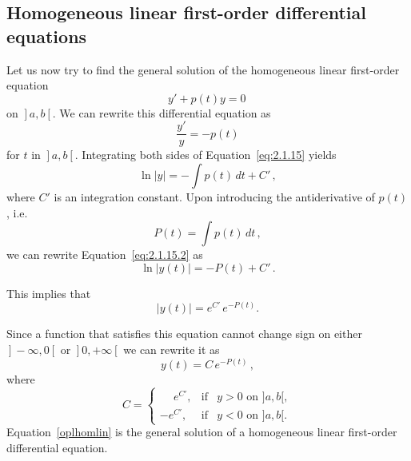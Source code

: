 \subsection{Homogeneous linear first-order differential equations}
\label{homolinsec}

Let us now try to find the general solution of the homogeneous linear first-order equation
$$
y'+p(t)y=0\,
$$
on $\left.\right]a,b\left[\right.$. 
We can rewrite this differential equation as 
\begin{equation}\label{eq:2.1.15}
\dfrac{y'}{y}=-p(t)
\end{equation}
for $t$ in $\left.\right]a,b\left[\right.$. Integrating both sides of Equation~\eqref{eq:2.1.15} yields 
\begin{equation}\label{eq:2.1.15.2}
\ln|y|=-\displaystyle\int p(t)\,d t + C'\,,
\end{equation}
where $C'$ is an integration constant. Upon introducing the antiderivative of $p(t)$, i.e.
$$
P(t)=\displaystyle\int p(t)\,d t\,,
$$
we can rewrite Equation~\eqref{eq:2.1.15.2} as
$$
\ln|y(t)|=-P(t) + C'\,.
$$

This implies that
$$
|y(t)|=e^{C'}\,e^{-P(t)}.
$$


Since a function that satisfies this equation cannot change sign on either $\left.\right]-\infty,0\left[\right.$ or $\left.\right]0,+\infty\left[\right.$ we can rewrite it as 
\begin{equation}
y(t)=C\,e^{-P(t)}\,,
\label{oplhomlin}
\end{equation}
 where
$$
C=\left\{\begin{array}{rcl}\phantom{-}e^{C'}, & \mbox{if} & y>0 \mbox{ on }
]a,b[, \\ -e^{C'}, &\mbox{if} & y<0\mbox{ on }]a,b[.\end{array}\right.
$$
Equation~\eqref{oplhomlin} is the general solution of a  homogeneous linear first-order differential equation. 

